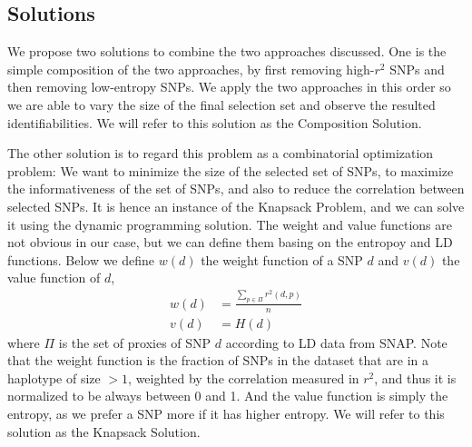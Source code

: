 \documentclass[14pt, oneside]{article}   	%
\begin{document}
\subsection{Solutions}\label{sec:soln}
We propose two solutions to combine the two approaches discussed.
One is the simple composition of the two approaches, by first removing high-$r^2$ SNPs and then removing low-entropy SNPs.
We apply the two approaches in this order so we are able to vary the size of the final selection set and observe the resulted identifiabilities.
We will refer to this solution as the Composition Solution.

The other solution is to regard this problem as a combinatorial optimization problem:
We want to minimize the size of the selected set of SNPs, to maximize the informativeness of the set of SNPs,
and also to reduce the correlation between selected SNPs.
It is hence an instance of the Knapsack Problem, and we can solve it using the dynamic programming solution.
The weight and value functions are not obvious in our case, but we can define them basing on the entropoy and LD functions.
Below we define $w(d)$ the weight function of a SNP $d$ and $v(d)$ the value function of $d$,
\begin{align*}
w(d) &= \frac{\sum\limits_{p \in \Pi} r^2(d, p)}{n}\\
v(d) &= H(d)
\end{align*}
where $\Pi$ is the set of proxies of SNP $d$ according to LD data from SNAP.
Note that the weight function is the fraction of SNPs in the dataset that are in a haplotype of size $> 1$,
weighted by the correlation measured in $r^2$, and thus it is normalized to be always between 0 and 1.
And the value function is simply the entropy, as we prefer a SNP more if it has higher entropy.
We will refer to this solution as the Knapsack Solution.
%
%
%
%
\end{document}
